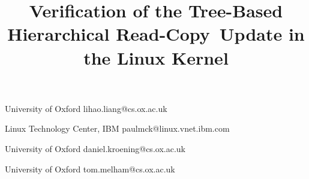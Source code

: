 \documentclass[preprint, 10pt, numbers]{sigplanconf}
\begin{document}
\title{Verification of the Tree-Based Hierarchical Read-Copy~Update in the Linux Kernel}
\date{}


           {University of Oxford}
           {lihao.liang@cs.ox.ac.uk}

           {Linux Technology Center, IBM}
           {paulmck@linux.vnet.ibm.com}

           {University of Oxford}
           {daniel.kroening@cs.ox.ac.uk}

           {University of Oxford}
           {tom.melham@cs.ox.ac.uk}




\maketitle
\end{document}
